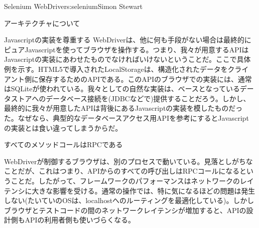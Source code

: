 \begin{aosachapter}{Selenium WebDriver}{s:selenium}{Simon Stewart}
\begin{aosasect1}{アーキテクチャについて}
\begin{aosasect2}{Javascriptの実装を尊重する}
WebDriverは、他に何も手段がない場合は最終的にピュアJavascriptを使ってブラウザを操作する。つまり、我々が用意するAPIはJavascriptの実装にあわせたものでなければいけないということだ。ここで具体例を示す。HTML5で導入されたLocalStorageは、構造化されたデータをクライアント側に保存するためのAPIである。このAPIのブラウザでの実装には、通常はSQLiteが使われている。我々としての自然な実装は、ベースとなっているデータストアへのデータベース接続を(JDBCなどで)提供することだろう。しかし、最終的に我々が用意したAPIは背後にあるJavascriptの実装を模したものだった。なぜなら、典型的なデータベースアクセス用APIを参考にするとJavascriptの実装とは食い違ってしまうからだ。

\end{aosasect2}

\begin{aosasect2}{すべてのメソッドコールはRPCである}

WebDriverが制御するブラウザは、別のプロセスで動いている。見落としがちなことだが、これはつまり、APIからのすべての呼び出しはRPCコールになるということだ。したがって、フレームワークのパフォーマンスはネットワークのレイテンシに大きな影響を受ける。通常の操作では、特に気になるほどの問題は発生しない(たいていのOSは、localhostへのルーティングを最適化している)。しかしブラウザとテストコードの間のネットワークレイテンシが増加すると、APIの設計側もAPIの利用者側も使いづらくなる。


\end{aosasect2}
\end{aosasect1}
\end{aosachapter}

